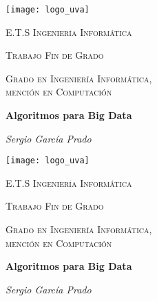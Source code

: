 \documentclass{subfiles}
\begin{document}
  \begin{titlepage}

    \centering
    \texttt{[image: logo\_uva]}\par\vspace{1cm}

    {\scshape\LARGE E.T.S Ingeniería Informática \par}
    \vspace{1cm}

    {\scshape\Large Trabajo Fin de Grado\par}
    \vspace{1.5cm}

    {\scshape\Large Grado en Ingeniería Informática, \\ mención en Computación\par}
    \vspace{1.5cm}

    {\huge\bfseries Algoritmos para Big Data\par}
    \vspace{2cm}

    {\Large\itshape Sergio García Prado \par}
    \vfill

  \end{titlepage}

  \begin{titlepage}

    \centering
    \texttt{[image: logo\_uva]}\par\vspace{1cm}

    {\scshape\LARGE E.T.S Ingeniería Informática \par}
    \vspace{1cm}

    {\scshape\Large Trabajo Fin de Grado\par}
    \vspace{1.5cm}

    {\scshape\Large Grado en Ingeniería Informática, \\ mención en Computación\par}
    \vspace{1.5cm}

    {\huge\bfseries Algoritmos para Big Data\par}
    \vspace{2cm}

    {\Large\itshape Sergio García Prado \par}
    \vfill

  \end{titlepage}
\end{document}
